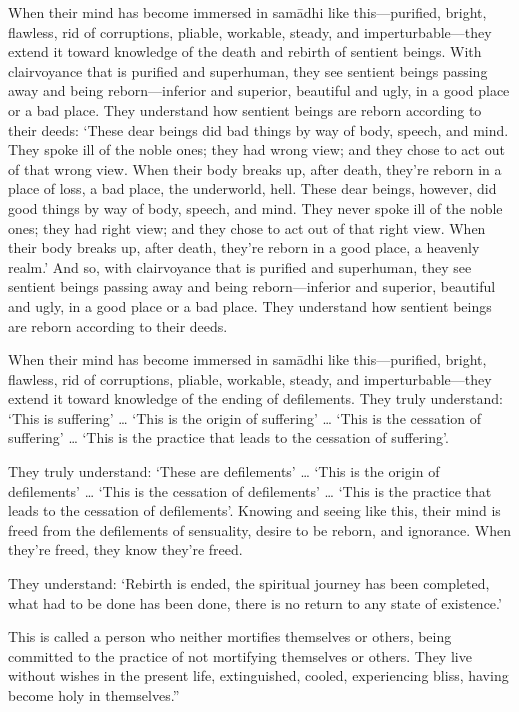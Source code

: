 \documentclass[12pt,openany]{book}%
\begin{document}
When their mind has become immersed in \textsanskrit{samādhi} like this—purified, bright, flawless, rid of corruptions, pliable, workable, steady, and imperturbable—they extend it toward knowledge of the death and rebirth of sentient beings. With clairvoyance that is purified and superhuman, they see sentient beings passing away and being reborn—inferior and superior, beautiful and ugly, in a good place or a bad place. They understand how sentient beings are reborn according to their deeds: ‘These dear beings did bad things by way of body, speech, and mind. They spoke ill of the noble ones; they had wrong view; and they chose to act out of that wrong view. When their body breaks up, after death, they’re reborn in a place of loss, a bad place, the underworld, hell. These dear beings, however, did good things by way of body, speech, and mind. They never spoke ill of the noble ones; they had right view; and they chose to act out of that right view. When their body breaks up, after death, they’re reborn in a good place, a heavenly realm.’ And so, with clairvoyance that is purified and superhuman, they see sentient beings passing away and being reborn—inferior and superior, beautiful and ugly, in a good place or a bad place. They understand how sentient beings are reborn according to their deeds. 

When their mind has become immersed in \textsanskrit{samādhi} like this—purified, bright, flawless, rid of corruptions, pliable, workable, steady, and imperturbable—they extend it toward knowledge of the ending of defilements. They truly understand: ‘This is suffering’ … ‘This is the origin of suffering’ … ‘This is the cessation of suffering’ … ‘This is the practice that leads to the cessation of suffering’. 

They truly understand: ‘These are defilements’ … ‘This is the origin of defilements’ … ‘This is the cessation of defilements’ … ‘This is the practice that leads to the cessation of defilements’. Knowing and seeing like this, their mind is freed from the defilements of sensuality, desire to be reborn, and ignorance. When they’re freed, they know they’re freed. 

They understand: ‘Rebirth is ended, the spiritual journey has been completed, what had to be done has been done, there is no return to any state of existence.’ 

This is called a person who neither mortifies themselves or others, being committed to the practice of not mortifying themselves or others. They live without wishes in the present life, extinguished, cooled, experiencing bliss, having become holy in themselves.” 
\end{document}
